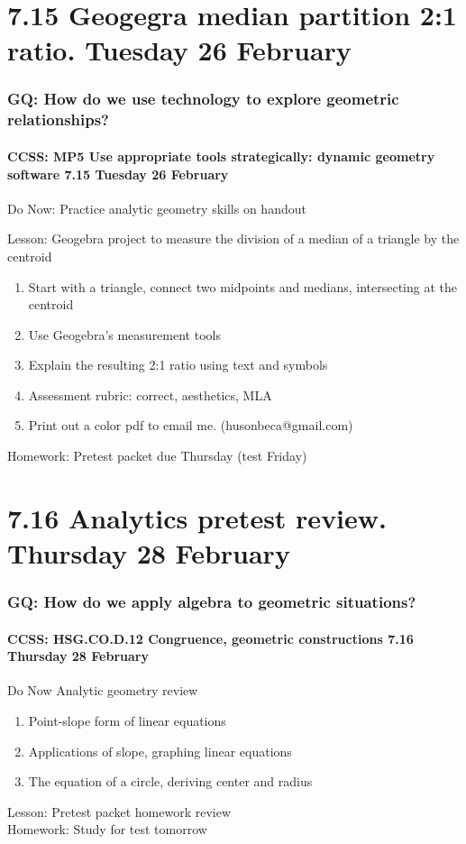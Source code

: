 \documentclass{beamer}
\begin{document}
\section{7.15 Geogegra median partition 2:1 ratio. Tuesday 26 February}
  \frame
  {
    \frametitle{GQ: How do we use technology to explore geometric relationships?}
    \framesubtitle{CCSS: MP5 Use appropriate tools strategically: dynamic geometry software \hfill \alert{7.15 Tuesday 26 February}}

    Do Now: Practice analytic geometry skills on handout
    \begin{block}{Lesson: Geogebra project to measure the division of a median of a triangle by the centroid}
      \begin{enumerate}
        \item Start with a triangle, connect two midpoints and medians, intersecting at the centroid
        \item Use Geogebra's measurement tools
        \item Explain the resulting 2:1 ratio using text and symbols
        \item Assessment rubric: correct, aesthetics, MLA
        \item Print out a color pdf to email me. (husonbeca@gmail.com)
      \end{enumerate}
    \end{block}
    Homework: Pretest packet due Thursday \alert{(test Friday)}
  }

\section{7.16 Analytics pretest review. Thursday 28 February}
  \frame
  {
    \frametitle{GQ: How do we apply algebra to geometric situations?}
    \framesubtitle{CCSS: HSG.CO.D.12 Congruence, geometric constructions \hfill \alert{7.16 Thursday 28 February}}

    \begin{block}{Do Now Analytic geometry review}
      \begin{enumerate}
        \item Point-slope form of linear equations
        \item Applications of slope, graphing linear equations
        \item The equation of a circle, deriving center and radius
      \end{enumerate}
    \end{block}
    Lesson: Pretest packet homework review\\[0.5cm]
    Homework: Study for \alert{test tomorrow}
  }
\end{document}
